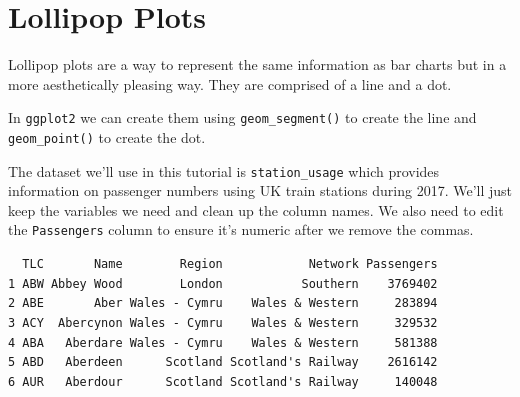 \documentclass[
  letterpaper,
  DIV=11,
  numbers=noendperiod]{scrreprt}
\newenvironment{Shaded}{\begin{snugshade}}{\end{snugshade}}
\newcommand{\DecValTok}[1]{\textcolor[rgb]{0.68,0.00,0.00}{#1}}
\newcommand{\FunctionTok}[1]{\textcolor[rgb]{0.28,0.35,0.67}{#1}}
\newcommand{\NormalTok}[1]{\textcolor[rgb]{0.00,0.23,0.31}{#1}}
\newcommand{\OtherTok}[1]{\textcolor[rgb]{0.00,0.23,0.31}{#1}}
\newcommand{\SpecialCharTok}[1]{\textcolor[rgb]{0.37,0.37,0.37}{#1}}
\newcommand{\StringTok}[1]{\textcolor[rgb]{0.13,0.47,0.30}{#1}}
\begin{document}

\hypertarget{lollipop-plots}{%
\chapter{Lollipop Plots}\label{lollipop-plots}}

Lollipop plots are a way to represent the same information as bar charts
but in a more aesthetically pleasing way. They are comprised of a line
and a dot.

In \texttt{ggplot2} we can create them using \texttt{geom\_segment()} to
create the line and \texttt{geom\_point()} to create the dot.

The dataset we'll use in this tutorial is \texttt{station\_usage} which
provides information on passenger numbers using UK train stations during
2017. We'll just keep the variables we need and clean up the column
names. We also need to edit the \texttt{Passengers} column to ensure
it's numeric after we remove the commas.

\begin{Shaded}
\end{Shaded}

\begin{verbatim}
  TLC       Name        Region            Network Passengers
1 ABW Abbey Wood        London           Southern    3769402
2 ABE       Aber Wales - Cymru    Wales & Western     283894
3 ACY  Abercynon Wales - Cymru    Wales & Western     329532
4 ABA   Aberdare Wales - Cymru    Wales & Western     581388
5 ABD   Aberdeen      Scotland Scotland's Railway    2616142
6 AUR   Aberdour      Scotland Scotland's Railway     140048
\end{verbatim}
\end{document}
